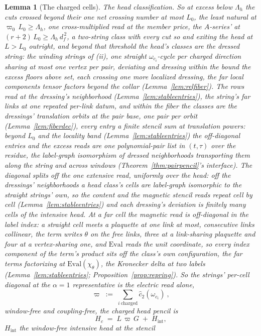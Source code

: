 \documentclass[11pt]{article}
\newtheorem{lemma}{Lemma}
\theoremstyle{definition}
\begin{document}
\begin{lemma}[The charged cells]
\emph{The head classification.} So at excess below $\Lambda_h$ the
cuts crossed beyond
their one net crossing number at most
$L_0$, the least natural at $\varpi_0\,L_0\ge\Lambda_h$, one
cross-multiplied read at the member price, the $A$-series' at
$(r+2)\,L_0\ge\Lambda_h\,d_f^{\,2}$, a two-string class with
every cut so and exiting the head at $L>L_0$ outright, and beyond that
threshold the head's classes are the \emph{dressed string}: the winding
strings of (ii), one straight $\omega_{c_i}$-cycle per charged
direction sharing at most one vertex per pair, deviating and dressing
within the bound the excess floors above set, each crossing one more
localized dressing, the far local components tensor factors beyond the
collar (Lemma~\ref{lem:relfiber}). The rows read at the dressing's
neighborhood (Lemma~\ref{lem:stableentries}), the string's far links
at one repeated per-link datum, and within the fiber the classes
are the dressings' translation orbits at the pair base, one pair per
orbit (Lemma~\ref{lem:fiberdec}), every
entry a finite stencil sum at translation powers: beyond $L_0$ and the
locality band (Lemma~\ref{lem:stableentries}) the off-diagonal entries and
the excess reads are one polynomial-pair list in $(t,\tau)$ over the
residue, the label-graph isomorphism
of dressed neighborhoods transporting them along the string and across
windows (Theorem~\ref{thm:pairpencil}'s interface). The diagonal
splits off the one extensive read, uniformly over
the head: off the dressings' neighborhoods a head class's cells are
label-graph isomorphic to the straight strings' own, so the content and
the magnetic stencil reads repeat cell by cell
(Lemma~\ref{lem:stableentries}) and each dressing's deviation is
finitely many cells of the intensive head. At a far cell the
magnetic read is off-diagonal in the label index: a straight cell
meets a plaquette at one link at most, consecutive links collinear,
the term writes $\theta$ on the free links, three at a link-sharing
plaquette and four at a vertex-sharing one, and $\mathrm{Eval}$
reads the unit coordinate, so every index component of the term's
product sits off the class's own configuration, the far terms
factorizing at $\mathrm{Eval}(\chi_\theta)$, the Kronecker delta at
two labels (Lemma~\ref{lem:stableentries};
Proposition~\ref{prop:repring}). So the strings' per-cell diagonal
at the $\alpha{=}1$ representative is the electric read alone,
\[
\varpi\;:=\;\sum_{i\ \mathrm{charged}}\hat c_2(\omega_{c_i})\ ,
\]
window-free and coupling-free, the charged head pencil is
\[
H_c\;=\;L\,\varpi\,G\;+\;H_{\mathrm{int}} ,
\]
$H_{\mathrm{int}}$ the window-free intensive head at the stencil

\end{lemma}
\end{document}
